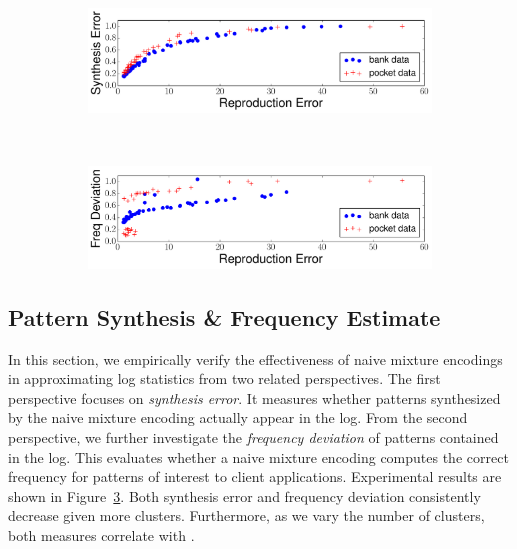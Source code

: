 \begin{figure}[h!]
\captionsetup[subfigure]{justification=centering}
    \centering 
    
\begin{subfigure}[b]{0.48\textwidth}
    \centering     
     \includegraphics[width=1\textwidth]{QueryLogSummarization/graphics/synthesis_error.pdf}
 \label{fig:synthesis_error_versus_reproduction_error}
\end{subfigure}
~
\begin{subfigure}[b]{0.48\textwidth}
    \centering      
    \includegraphics[width=1\textwidth]{QueryLogSummarization/graphics/marginal_deviation.pdf}
 \label{fig:marginal_deviation_versus_reproduction_error}
\end{subfigure}

 \label{fig:effectiveness_of_naive_mixture_encoding} 
 \trimfigurewhitespace
\end{figure} 

\subsection{Pattern Synthesis \& Frequency Estimate}
In this section, we empirically verify the effectiveness of naive mixture encodings in approximating log statistics from two related perspectives. 
The first perspective focuses on \textit{synthesis error}. 
It measures whether patterns synthesized by the naive mixture encoding actually appear in the log.
From the second perspective, we further investigate the \textit{frequency deviation} of patterns contained in the log.
This evaluates whether a naive mixture encoding computes the correct frequency for patterns of interest to client applications.
Experimental results are shown in Figure~\ref{fig:effectiveness_of_naive_mixture_encoding}.
Both synthesis error and frequency deviation consistently decrease given more clusters.
Furthermore, as we vary the number of clusters, both measures correlate with \errorname.

